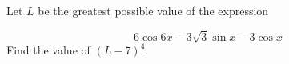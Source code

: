 Let $L$ be the greatest possible value of the expression

\[
6\cos 6x-3\sqrt{3}\sin x-3\cos x
\]Find the value of $(L-7)^4.$
